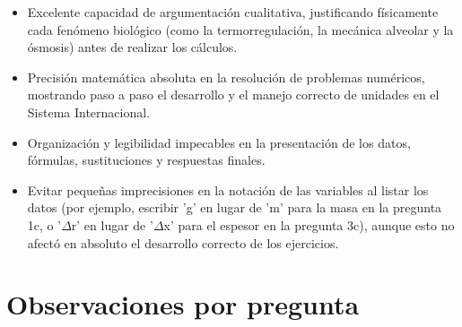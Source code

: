 \documentclass[11pt,a4paper]{article}
\begin{document}
\vspace{4pt}
\begin{minipage}[t]{0.48\linewidth}
  \begin{tcolorbox}[cajaFortaleza, title={Fortalezas}]
\begin{itemize}[leftmargin=1.5em, itemsep=2pt]
  \item Excelente capacidad de argumentación cualitativa, justificando físicamente cada fenómeno biológico (como la termorregulación, la mecánica alveolar y la ósmosis) antes de realizar los cálculos.
  \item Precisión matemática absoluta en la resolución de problemas numéricos, mostrando paso a paso el desarrollo y el manejo correcto de unidades en el Sistema Internacional.
  \item Organización y legibilidad impecables en la presentación de los datos, fórmulas, sustituciones y respuestas finales.
\end{itemize}
  \end{tcolorbox}
\end{minipage}
\hfill
\begin{minipage}[t]{0.48\linewidth}
  \begin{tcolorbox}[cajaMejora, title={Areas de mejora}]
\begin{itemize}[leftmargin=1.5em, itemsep=2pt]
  \item Evitar pequeñas imprecisiones en la notación de las variables al listar los datos (por ejemplo, escribir 'g' en lugar de 'm' para la masa en la pregunta 1c, o '$\Delta$r' en lugar de '$\Delta$x' para el espesor en la pregunta 3c), aunque esto no afectó en absoluto el desarrollo correcto de los ejercicios.
\end{itemize}
  \end{tcolorbox}
\end{minipage}

\section*{Observaciones por pregunta}
\end{document}
